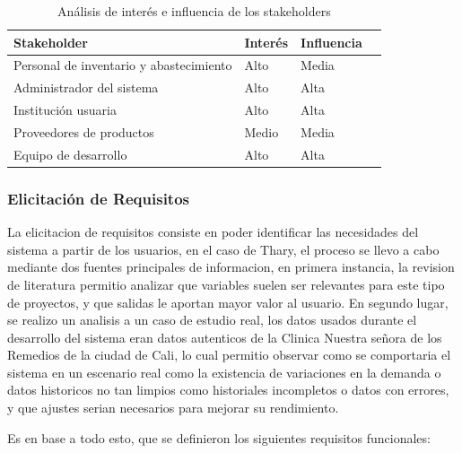 \begin{table}[H]
\centering
\caption{Análisis de interés e influencia de los stakeholders}
\label{tab:stakeholders_interes_influencia}

\begin{tabularx}{\textwidth}{
    >{\raggedright\arraybackslash}p{4cm}
    >{\raggedright\arraybackslash}X
    >{\centering\arraybackslash}p{3cm}
    >{\centering\arraybackslash}p{3cm}
}
\hline
\textbf{Stakeholder} & \textbf{Interés} & \textbf{Influencia} \\
\hline

Personal de inventario y abastecimiento
& Alto
& Media
\\

Administrador del sistema
& Alto
& Alta
\\

Institución usuaria
& Alto
& Alta
\\

Proveedores de productos
& Medio
& Media
\\

Equipo de desarrollo
& Alto
& Alta
\\

\hline
\end{tabularx}
\end{table}

\subsubsection{Elicitación de Requisitos}
La elicitacion de requisitos consiste en poder identificar las necesidades del sistema a partir de los usuarios, en el caso de Thary, el proceso se llevo a cabo mediante dos fuentes principales de informacion, en primera instancia, la revision de literatura permitio analizar que variables suelen ser relevantes para este tipo de proyectos, y que salidas le aportan mayor valor al usuario. En segundo lugar, se realizo un analisis a un caso de estudio real, los datos usados durante el desarrollo del sistema eran datos autenticos de la Clinica Nuestra señora de los Remedios de la ciudad de Cali, lo cual permitio observar como se comportaria el sistema en un escenario real como la existencia de variaciones en la demanda o datos historicos no tan limpios como historiales incompletos o datos con errores, y que ajustes serian necesarios para mejorar su rendimiento.

Es en base a todo esto, que se definieron los siguientes requisitos funcionales:

